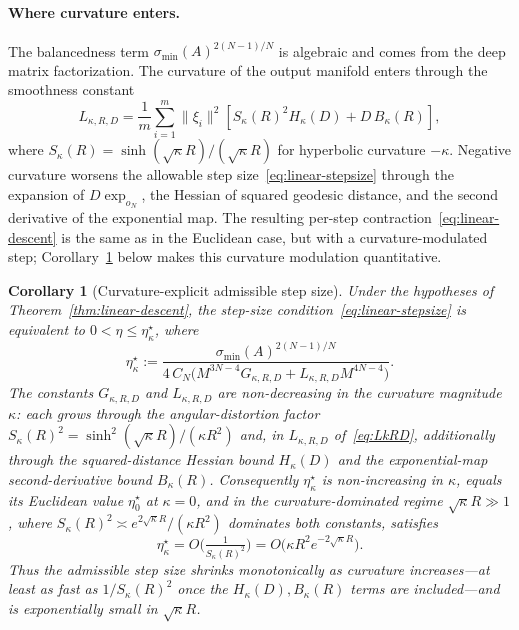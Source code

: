 \documentclass[letterpaper]{article}
\newtheorem{corollary}[theorem]{Corollary}
\begin{document}
\paragraph{Where curvature enters.}
The balancedness term \(\sigma_{\min}(A)^{2(N-1)/N}\) is algebraic and
comes from the deep matrix factorization. The curvature of the output
manifold enters through the smoothness constant
\begin{equation}
\label{eq:LkRD}
L_{\kappa,R,D}
=
\frac1m\sum_{i=1}^m \|\xi_i\|^2
\left[
S_\kappa(R)^2 H_\kappa(D) + D\, B_\kappa(R)
\right],
\end{equation}
where \(S_\kappa(R) = \sinh(\sqrt{\kappa}R)/(\sqrt{\kappa}R)\) for
hyperbolic curvature \(-\kappa\). Negative curvature worsens the
allowable step size~\eqref{eq:linear-stepsize} through the expansion of
\(D\exp_{o_N}\), the Hessian of squared geodesic distance, and the second
derivative of the exponential map. The resulting per-step
contraction~\eqref{eq:linear-descent} is the same as in the Euclidean
case, but with a curvature-modulated step; Corollary~\ref{cor:curvature-stepsize}
below makes this curvature modulation quantitative.

\begin{corollary}[Curvature-explicit admissible step size]
\label{cor:curvature-stepsize}
Under the hypotheses of Theorem~\ref{thm:linear-descent}, the step-size
condition~\eqref{eq:linear-stepsize} is equivalent to
$0<\eta\le\eta^\star_\kappa$, where
\begin{equation}
\label{eq:eta-star-kappa}
\eta^\star_\kappa
:=
\frac{\sigma_{\min}(A)^{2(N-1)/N}}
     {4\,C_N\big(M^{3N-4}G_{\kappa,R,D}+L_{\kappa,R,D}M^{4N-4}\big)} .
\end{equation}
The constants $G_{\kappa,R,D}$ and $L_{\kappa,R,D}$ are non-decreasing in the
curvature magnitude $\kappa$: each grows through the angular-distortion
factor $S_\kappa(R)^2=\sinh^2(\sqrt{\kappa}R)/(\kappa R^2)$ and, in
$L_{\kappa,R,D}$ of~\eqref{eq:LkRD}, additionally through the
squared-distance Hessian bound $H_\kappa(D)$ and the exponential-map
second-derivative bound $B_\kappa(R)$. Consequently $\eta^\star_\kappa$ is
non-increasing in $\kappa$, equals its Euclidean value $\eta^\star_0$ at
$\kappa=0$, and in the curvature-dominated regime $\sqrt{\kappa}R\gg1$,
where $S_\kappa(R)^2\asymp e^{2\sqrt{\kappa}R}/(\kappa R^2)$ dominates both
constants, satisfies
\begin{equation}
\label{eq:eta-star-asymp}
\eta^\star_\kappa
=
O\!\Big(\tfrac{1}{S_\kappa(R)^2}\Big)
=
O\!\big(\kappa R^2 e^{-2\sqrt{\kappa}R}\big).
\end{equation}
Thus the admissible step size shrinks monotonically as curvature
increases---at least as fast as $1/S_\kappa(R)^2$ once the
$H_\kappa(D),B_\kappa(R)$ terms are included---and is exponentially small in
$\sqrt{\kappa}R$.
\end{corollary}
\end{document}
